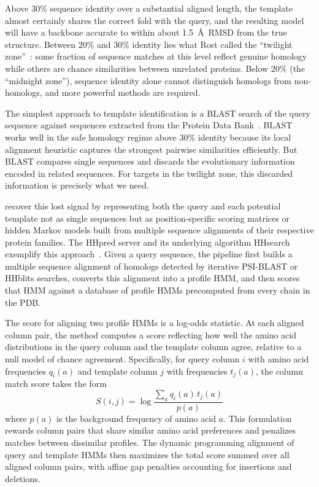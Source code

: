 Above 30\% sequence identity over a substantial aligned length, the template almost certainly shares the correct fold with the query, and the resulting model will have a backbone accurate to within about 1.5~\AA\ RMSD from the true structure. Between 20\% and 30\% identity lies what Rost called the ``twilight zone''~\cite{rost1999twilight}: some fraction of sequence matches at this level reflect genuine homology while others are chance similarities between unrelated proteins. Below 20\% (the ``midnight zone''), sequence identity alone cannot distinguish homologs from non-homologs, and more powerful methods are required.

The simplest approach to template identification is a BLAST search of the query sequence against sequences extracted from the Protein Data Bank~\cite{altschul1997}. BLAST works well in the safe homology regime above 30\% identity because its local alignment heuristic captures the strongest pairwise similarities efficiently. But BLAST compares single sequences and discards the evolutionary information encoded in related sequences. For targets in the twilight zone, this discarded information is precisely what we need.

 recover this lost signal by representing both the query and each potential template not as single sequences but as position-specific scoring matrices or hidden Markov models built from multiple sequence alignments of their respective protein families. The HHpred server and its underlying algorithm HHsearch exemplify this approach~\cite{soeding2005,remmert2012}. Given a query sequence, the pipeline first builds a multiple sequence alignment of homologs detected by iterative PSI-BLAST or HHblits searches, converts this alignment into a profile HMM, and then scores that HMM against a database of profile HMMs precomputed from every chain in the PDB.

The score for aligning two profile HMMs is a log-odds statistic. At each aligned column pair, the method computes a score reflecting how well the amino acid distributions in the query column and the template column agree, relative to a null model of chance agreement. Specifically, for query column $i$ with amino acid frequencies $q_i(a)$ and template column $j$ with frequencies $t_j(a)$, the column match score takes the form
\begin{equation}
S(i,j) = \log \frac{\sum_a q_i(a)\, t_j(a)}{p(a)}
\label{eq:hhsearch-score}
\end{equation}
where $p(a)$ is the background frequency of amino acid $a$. This formulation rewards column pairs that share similar amino acid preferences and penalizes matches between dissimilar profiles. The dynamic programming alignment of query and template HMMs then maximizes the total score summed over all aligned column pairs, with affine gap penalties accounting for insertions and deletions.

